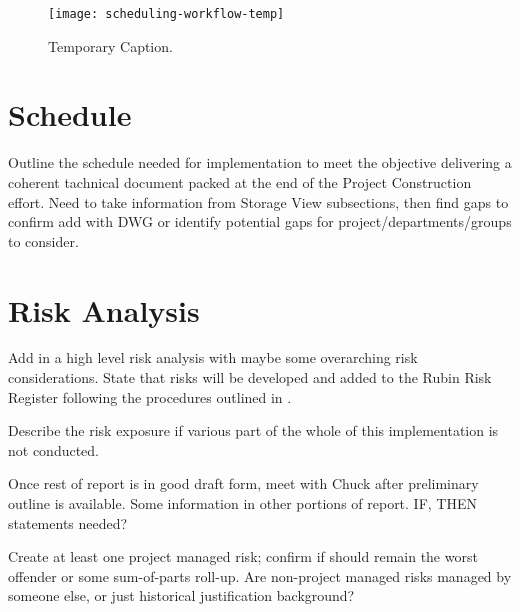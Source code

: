 \begin{figure}[t]
\caption{Temporary Caption.}
\centering
\texttt{[image: scheduling-workflow-temp]}
\label{fig:scheduling-workflow}
\end{figure}

\section{Schedule}

Outline the schedule needed for implementation to meet the objective delivering a coherent tachnical document packed at the end of the Project Construction effort.
Need to take information from Storage View subsections, then find gaps to confirm add with DWG or identify potential gaps for project/departments/groups to consider.


\section{Risk Analysis}

Add in a high level risk analysis with maybe some overarching risk considerations. 
State that risks will be developed and added to the Rubin Risk Register following  the procedures outlined in .

Describe the risk exposure if various part of the whole of this implementation is not conducted.

Once rest of report is in good draft form, meet with Chuck after preliminary outline is available.
Some information in other portions of report.
IF, THEN statements needed?

Create at least one project managed risk; confirm if should remain the worst offender or some sum-of-parts roll-up.
Are non-project managed risks managed by someone else, or just historical justification background?


